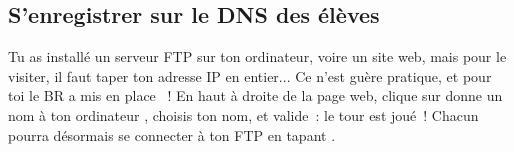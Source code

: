 \subsection{S'enregistrer sur le DNS des élèves}
\label{dnsapp}

Tu as installé un serveur FTP sur ton ordinateur, voire un site web, mais pour le visiter, il faut taper ton adresse IP en entier...
Ce n'est guère pratique, et pour toi le BR a mis en place ~!
En haut à droite de la page web, clique sur \og donne un nom à ton ordinateur \fg, choisis ton nom, et valide~: le tour est joué~! Chacun pourra désormais se connecter à ton FTP en tapant .
